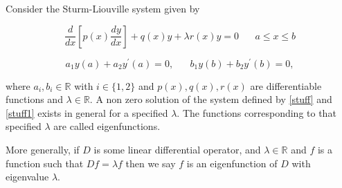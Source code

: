 \documentclass[12pt]{article}
\begin{document}
Consider the Sturm-Liouville system given by

\begin{equation}
\frac{d}{dx}\left[p(x)\frac{dy}{dx}\right]+q(x)y+\lambda
r(x)y=0\;\;\;\;\;\;a\leq x\leq b \label{stuff}
\end{equation}

\begin{equation}
a_{1}y(a)+a_{2}y^{\prime}(a)=0,\;\;\;
\;\;\;b_{1}y(b)+b_{2}y^{\prime}(b)=0, \label{stuff1}
\end{equation}

where $a_{i},b_{i}\in \mathbb{R}$ with $i\in \{1,2\}$ and
$p(x),q(x),r(x)$ are differentiable functions and
$\lambda\in\mathbb{R}$. A non zero solution of the system defined
by \eqref{stuff} and \eqref{stuff1} exists in general for a
specified $\lambda$.  The functions corresponding to that
specified $\lambda$ are called eigenfunctions.



More generally, if $D$ is some linear differential operator, and
$\lambda\in \mathbb{R}$ and $f$ is a function such that
$Df=\lambda f$ then we say $f$ is an eigenfunction of $D$ with
eigenvalue $\lambda$.
\end{document}
